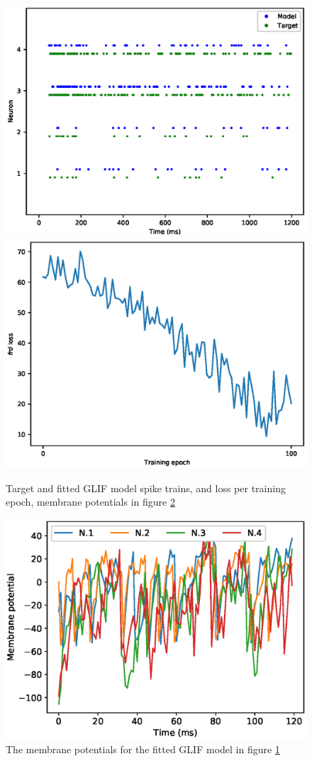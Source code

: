 \documentclass[mphil,deptreport,ianc]{infthesis} %
\begin{document}
\begin{figure}
    \centering
    \includegraphics[width=0.49\columnwidth]{figures/samples/SameModelClassTarget/export_spike_trains_euid_12-10_09-45-02-423.eps}
    \includegraphics[width=0.49\columnwidth]{figures/samples/SameModelClassTarget/export_GLIF_plot_loss_euid_12-09_16-17-13-464.eps}
    \caption{Target and fitted GLIF model spike trains, and loss per training epoch, membrane potentials in figure \ref{fig:sample_GLIF_vs}}
    \label{fig:sample_GLIF_spikes_loss}
\end{figure}

\begin{figure}
    \centering
    \includegraphics[width=0.6\columnwidth]{figures/samples/membrane_potentials/export_sample_GLIF_white_noise.eps}
    \caption{The membrane potentials for the fitted GLIF model in figure \ref{fig:sample_GLIF_spikes_loss}}
    \label{fig:sample_GLIF_vs}
\end{figure}
\end{document}
